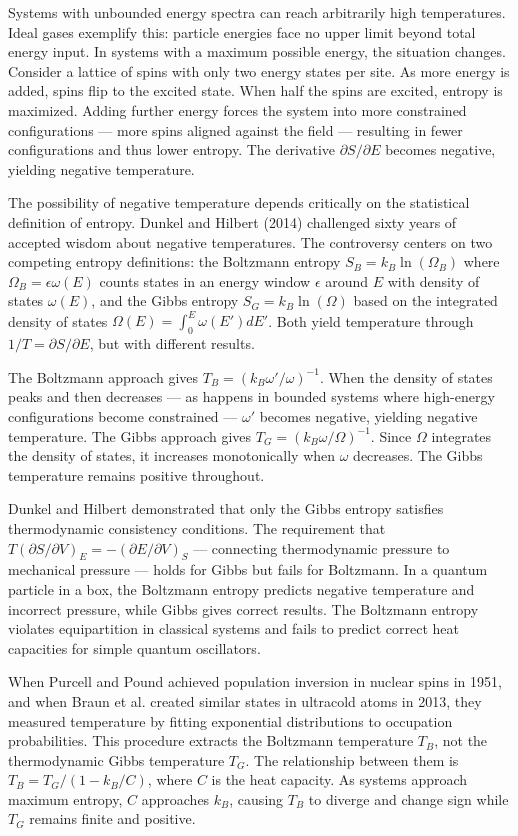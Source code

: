 Systems with unbounded energy spectra can reach arbitrarily high temperatures. Ideal gases exemplify this: particle energies face no upper limit beyond total energy input. In systems with a maximum possible energy, the situation changes. Consider a lattice of spins with only two energy states per site. As more energy is added, spins flip to the excited state. When half the spins are excited, entropy is maximized. Adding further energy forces the system into more constrained configurations — more spins aligned against the field — resulting in fewer configurations and thus lower entropy. The derivative $ \partial S/\partial E $ becomes negative, yielding negative temperature.

The possibility of negative temperature depends critically on the statistical definition of entropy. Dunkel and Hilbert (2014) challenged sixty years of accepted wisdom about negative temperatures. The controversy centers on two competing entropy definitions: the Boltzmann entropy $S_B = k_B \ln(\Omega_B)$ where $\Omega_B = \epsilon \omega(E)$ counts states in an energy window $\epsilon$ around $E$ with density of states $\omega(E)$, and the Gibbs entropy $S_G = k_B \ln(\Omega)$ based on the integrated density of states $\Omega(E) = \int_0^E \omega(E') dE'$. Both yield temperature through $1/T = \partial S/\partial E$, but with different results.

The Boltzmann approach gives $T_B = (k_B \omega'/\omega)^{-1}$. When the density of states peaks and then decreases — as happens in bounded systems where high-energy configurations become constrained — $\omega'$ becomes negative, yielding negative temperature. The Gibbs approach gives $T_G = (k_B \omega/\Omega)^{-1}$. Since $\Omega$ integrates the density of states, it increases monotonically when $\omega$ decreases. The Gibbs temperature remains positive throughout.

Dunkel and Hilbert demonstrated that only the Gibbs entropy satisfies thermodynamic consistency conditions. The requirement that $T(\partial S/\partial V)_E = -(\partial E/\partial V)_S$ — connecting thermodynamic pressure to mechanical pressure — holds for Gibbs but fails for Boltzmann. In a quantum particle in a box, the Boltzmann entropy predicts negative temperature and incorrect pressure, while Gibbs gives correct results. The Boltzmann entropy violates equipartition in classical systems and fails to predict correct heat capacities for simple quantum oscillators.

When Purcell and Pound achieved population inversion in nuclear spins in 1951, and when Braun et al. created similar states in ultracold atoms in 2013, they measured temperature by fitting exponential distributions to occupation probabilities. This procedure extracts the Boltzmann temperature $T_B$, not the thermodynamic Gibbs temperature $T_G$. The relationship between them is $T_B = T_G/(1 - k_B/C)$, where $C$ is the heat capacity. As systems approach maximum entropy, $C$ approaches $k_B$, causing $T_B$ to diverge and change sign while $T_G$ remains finite and positive.

